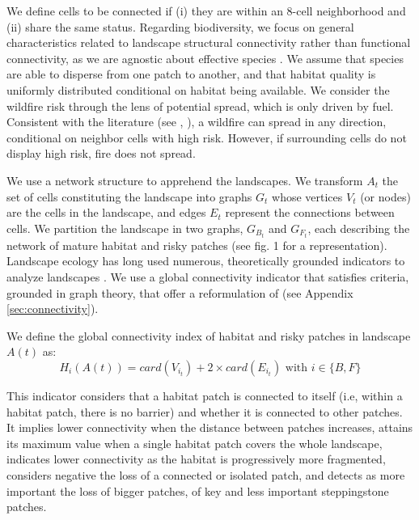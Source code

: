 We define cells to be connected if (i) they are within an 8-cell neighborhood and (ii) share the same status.
Regarding biodiversity, we focus on general characteristics related to landscape structural connectivity rather than functional connectivity, as we are agnostic about effective species \citep{Fahrig2011}. We assume that species are able to disperse from one patch to another, and that habitat quality is uniformly distributed conditional on habitat being available. We consider the wildfire risk through the lens of potential spread, which is only driven by fuel. Consistent with the literature (see \cite{Peterson_2009}, \cite{pais_cell2fire_2021, gonzalez-olabarria_fire_2023}), a wildfire can spread in any direction, conditional on neighbor cells with high risk. However, if surrounding cells do not display high risk, fire does not spread.

We use a network structure to apprehend the landscapes. We transform $A_t$ the set of cells constituting the landscape into graphs $G_t$ whose vertices $V_t$ (or nodes) are the cells in the landscape, and edges $E_t$ represent the connections between cells. We partition the landscape in two graphs, $G_{B_t}$ and $G_{F_t}$, each describing the network of mature habitat and risky patches (see fig. 1 for a representation). Landscape ecology has long used numerous, theoretically grounded indicators to analyze landscapes \citep{urban_landscape_2001,minor_graph-theory_2008}. We use a global connectivity indicator that satisfies \cite{pascual-hortal_comparison_2006} criteria, grounded in graph theory, that offer a reformulation of \cite{rachmawati_optimisation_2016} (see Appendix \ref{sec:connectivity}). 



We define the global connectivity index of habitat and risky patches in landscape $A(t)$ as:
\begin{equation}
H_i(A(t)) = card(V_{i_t}) +2\times card(E_{i_t}) \text{ with } i \in \{B,F\}
\label{eq:high_connectivity}
\end{equation}

This indicator considers that a habitat patch is connected to itself (i.e, within a habitat patch, there is no barrier) and whether it is connected to other patches.  
It implies lower connectivity when the distance between patches increases, attains its maximum value when a single habitat patch covers the whole landscape, indicates lower connectivity as the habitat is progressively more fragmented, considers negative the loss of a connected or isolated patch, and detects as more important the loss of bigger patches, of key and less important steppingstone patches.


